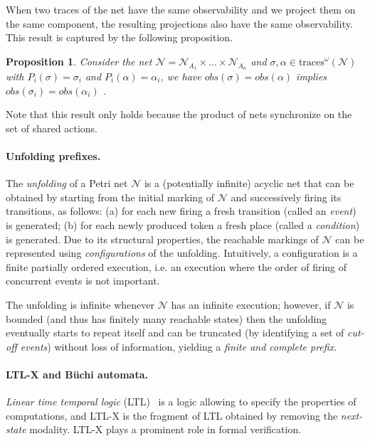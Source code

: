 \documentclass[a4paper]{article}
\newcommand{\obs}[1]{obs(#1)}
\newcommand{\proj}[2]{P_{#1}({#2})}
\newcommand{\buchi}                {\mbox{B\"uchi}\xspace}
\newcommand\netn{{\mathcal{N}}}
\newtheorem{prop}{Proposition}
\newcommand{\inftraces}[1]{\mathrm{traces}^{\omega}(#1)}
\begin{document}
When two traces of the net have the same observability and we project them on the same component, the resulting projections also have the same observability. This result is captured by the following proposition.

\begin{prop}
  Consider the net $\netn = \netn_{A_1}\times \dots \times \netn_{A_n}$ and $\sigma, \alpha \in \inftraces \netn$ with $\proj i \sigma = \sigma_i$ and $\proj i \alpha = \alpha_i$, we have $\obs \sigma = \obs \alpha$ implies $\obs{\sigma_i} = \obs{\alpha_i}$
  \label{prop:obs}.
\end{prop}

Note that this result only holds because the product of nets synchronize on the set of shared actions.

\paragraph{Unfolding prefixes.}

The \emph{unfolding} of a Petri net $\netn$ is a (potentially infinite) acyclic net that can be obtained by starting from the initial marking of $\netn$ and successively firing its transitions, as follows: (a) for each new firing a fresh transition (called an \emph{event}) is generated; (b) for each newly produced token a fresh place (called a \emph{condition}) is generated. Due to its structural properties, the reachable markings of $\netn$ can be represented using \emph{configurations} of the unfolding. Intuitively, a configuration is a finite partially ordered execution, i.e. an execution where the order of firing of concurrent events is not important.

The unfolding is infinite whenever $\netn$ has an infinite execution; however, if $\netn$ is bounded (and thus has finitely many reachable states) then the unfolding eventually starts to repeat itself and can be truncated (by identifying a set of \emph{cut-off events}) without loss of information, yielding a \emph{finite and complete prefix.} 

\paragraph{LTL-X and \buchi automata.}

\emph{Linear time temporal logic} (LTL)~\cite{P-77} is a logic allowing to specify the properties of computations, and LTL-X is the fragment of LTL obtained by removing the \emph{next-state} modality. LTL-X plays a prominent role in formal verification.
\end{document}
